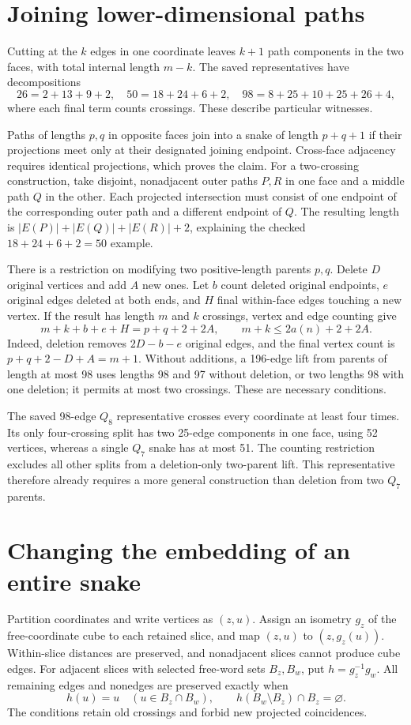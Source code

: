 \documentclass[11pt,a4paper]{article}
\begin{document}
\section{Joining lower-dimensional paths}
Cutting at the $k$ edges in one coordinate leaves $k+1$ path components
in the two faces, with total internal length $m-k$.
The saved representatives have decompositions
\[
26=2+13+9+2,\quad 50=18+24+6+2,\quad
98=8+25+10+25+26+4,
\]
where each final term counts crossings. These describe particular witnesses.

Paths of lengths $p,q$ in opposite faces join into a snake of length
$p+q+1$ if their projections meet only at their designated joining endpoint.
Cross-face adjacency requires identical projections, which proves the claim.
For a two-crossing construction, take disjoint, nonadjacent outer paths
$P,R$ in one face and a middle path $Q$ in the other. Each projected
intersection must consist of one endpoint of the corresponding outer path
and a different endpoint of $Q$. The resulting length is
$|E(P)|+|E(Q)|+|E(R)|+2$, explaining the checked $18+24+6+2=50$ example.

There is a restriction on modifying two positive-length parents $p,q$.
Delete $D$ original vertices and add $A$ new ones. Let $b$ count deleted
original endpoints, $e$ original edges deleted at both ends, and $H$ final
within-face edges touching a new vertex. If the result has length $m$
and $k$ crossings, vertex and edge counting give
\[
m+k+b+e+H=p+q+2+2A,\qquad m+k\le2a(n)+2+2A.
\]
Indeed, deletion removes $2D-b-e$ original edges, and the final vertex
count is $p+q+2-D+A=m+1$.
Without additions, a 196-edge lift from parents of length at most 98
uses lengths 98 and 97 without deletion, or two lengths 98 with one
deletion; it permits at most two crossings. These are necessary conditions.

The saved 98-edge $Q_8$ representative crosses every coordinate at least
four times. Its only four-crossing split has two 25-edge components in
one face, using 52 vertices, whereas a single $Q_7$ snake has at most 51.
The counting restriction excludes all other splits from a deletion-only
two-parent lift. This representative therefore already requires a more
general construction than deletion from two $Q_7$ parents.

\section{Changing the embedding of an entire snake}
Partition coordinates and write vertices as $(z,u)$. Assign an isometry
$g_z$ of the free-coordinate cube to each retained slice, and map
$(z,u)$ to $(z,g_z(u))$. Within-slice distances are preserved, and
nonadjacent slices cannot produce cube edges.
For adjacent slices with selected free-word sets $B_z,B_w$, put
$h=g_z^{-1}g_w$. All remaining edges and nonedges are preserved exactly when
\[
h(u)=u\quad(u\in B_z\cap B_w),\qquad
h(B_w\setminus B_z)\cap B_z=\varnothing.
\]
The conditions retain old crossings and forbid new projected coincidences.
\end{document}
